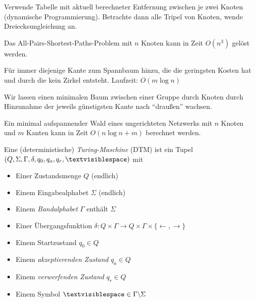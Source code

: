 \documentclass{cheat-sheet}
\begin{document}
\begin{alg}
  Verwende Tabelle mit aktuell berechneter Entfernung zwischen je zwei Knoten (dynamische Programmierung). Betrachte dann alle Tripel von Knoten, wende Dreiecksungleichung an.
\end{alg}

\begin{satz}
  Das All-Pairs-Shortest-Paths-Problem mit $n$ Knoten kann in Zeit $O(n^3)$ gelöst werden.
\end{satz}




\begin{alg}[Kruskal]
  Für immer diejenige Kante zum Spannbaum hinzu, die die geringsten Kosten hat und durch die kein Zirkel entsteht. Laufzeit: $O(m \log n)$
\end{alg}


\begin{alg}[Prim]
  Wir lassen einen minimalen Baum zwischen einer Gruppe durch Knoten durch Hinzunahme der jeweils günstigsten Kante nach "`draußen"' wachsen.
\end{alg}

\begin{satz}
  Ein minimal aufspannender Wald eines ungerichteten Netzwerks mit $n$ Knoten und $m$ Kanten kann in Zeit $O(n \log n + m)$ berechnet werden.
\end{satz}



\begin{defn}
  Eine (deterministische) \emph{Turing-Maschine} (DTM) ist ein Tupel $(Q, \Sigma, \Gamma, \delta, q_{0}, q_{a}, q_{r}, \textvisiblespace)$ mit

  \begin{itemize}{\leftmargin=0em}
    \setlength{\leftmargin}{0pt}
    \item Einer Zustandsmenge $Q$ (endlich)
    \item Einem Eingabealphabet $\Sigma$ (endlich)
    \item Einem \emph{Bandalphabet} $\Gamma$ enthält $\Sigma$
    \item Einer Übergangsfunktion $\delta : Q \times \Gamma \to Q \times \Gamma \times \{ \leftarrow, \rightarrow \} $
    \item Einem Startzustand $q_{0} \in Q$
    \item Einem \emph{akzeptierenden Zustand} $q_{a} \in Q$
    \item Einem \emph{verwerfenden Zustand} $q_{r} \in Q$
    \item Einem Symbol $\textvisiblespace \in \Gamma \backslash \Sigma$
  \end{itemize}
\end{defn}
\end{document}
